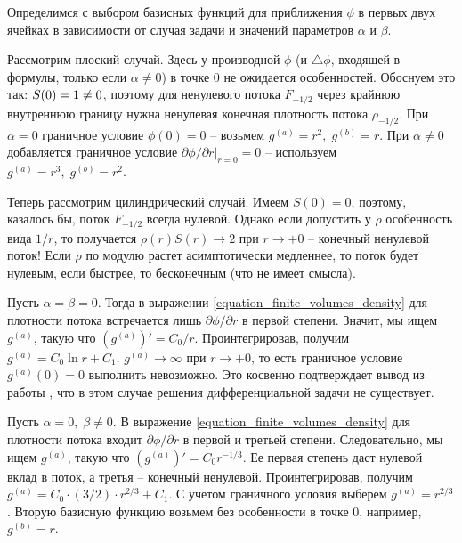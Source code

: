 \documentclass[a4paper,12pt]{article}
\newcommand*{\hm}[1]{#1\nobreak\discretionary{}
{\hbox{$\mathsurround=0pt #1$}}{}}
\theoremstyle{plain}
\theoremstyle{definition}
\begin{document}
Определимся с выбором базисных функций для приближения $\phi$ в первых двух ячейках в зависимости от случая задачи и значений параметров $\alpha$ и $\beta$.

Рассмотрим плоский случай. Здесь у производной $\phi$ (и $\triangle \phi$, входящей в формулы, только если $\alpha \neq 0$) в точке $0$ не ожидается особенностей. Обоснуем это так: $S(0) = 1 \hm \neq 0$, поэтому для ненулевого потока $F_{-1/2}$ через крайнюю внутреннюю границу нужна ненулевая конечная плотность потока $\rho_{-1/2}$. При $\alpha = 0$ граничное условие $\phi(0) = 0$ -- возьмем $g^{(a)} = r^2, \; g^{(b)} = r$. При $\alpha \neq 0$ добавляется граничное условие $\partial \phi / \partial r |_{r = 0} = 0$ -- используем $g^{(a)} = r^3, \; g^{(b)} = r^2$.

Теперь рассмотрим цилиндрический случай. Имеем $S(0) = 0$, поэтому, казалось бы, поток $F_{-1/2}$ всегда нулевой. Однако если допустить у $\rho$ особенность вида $1/r$, то получается $\rho(r) S(r) \to 2$ при $r \to +0$ -- конечный ненулевой поток! Если $\rho$ по модулю растет асимптотически медленнее, то поток будет нулевым, если быстрее, то бесконечным (что не имеет смысла).

Пусть $\alpha = \beta = 0$. Тогда в выражении \eqref{equation_finite_volumes_density} для плотности потока встречается лишь $\partial \phi / \partial r$ в первой степени. Значит, мы ищем $g^{(a)}$, такую что $(g^{(a)})' = C_0/r$. Проинтегрировав, получим $g^{(a)} = C_0 \ln r + C_1$. $g^{(a)} \to \infty$ при $r \to +0$, то есть граничное условие $g^{(a)}(0) = 0$ выполнить невозможно. Это косвенно подтверждает вывод из работы \cite{zipunova_higher_codimension}, что в этом случае решения дифференциальной задачи не существует.

Пусть $\alpha = 0, \; \beta \neq 0$. В выражение \eqref{equation_finite_volumes_density} для плотности потока входит $\partial \phi / \partial r$ в первой и третьей степени. Следовательно, мы ищем $g^{(a)}$, такую что $(g^{(a)})' = C_0 r^{-1/3}$. Ее первая степень даст нулевой вклад в поток, а третья -- конечный ненулевой. Проинтегрировав, получим $g^{(a)} = C_0 \cdot (3/2) \cdot r^{2/3} + C_1$. С учетом граничного условия выберем $g^{(a)} = r^{2/3}$. Вторую базисную функцию возьмем без особенности в точке $0$, например, $g^{(b)} = r$.
\end{document}
